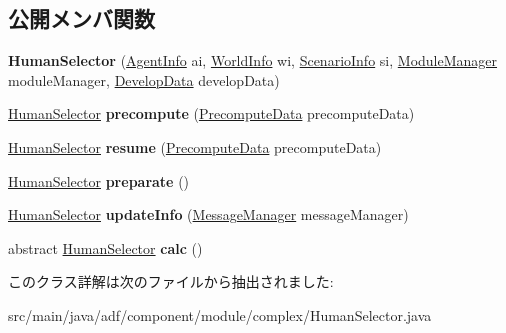 \subsection*{公開メンバ関数}
\begin{DoxyCompactItemize}
\item 
\hypertarget{classadf_1_1component_1_1module_1_1complex_1_1HumanSelector_a15c1bfebf9e8b8a6c2b2948cd65df4bb}{}\label{classadf_1_1component_1_1module_1_1complex_1_1HumanSelector_a15c1bfebf9e8b8a6c2b2948cd65df4bb} 
{\bfseries Human\+Selector} (\hyperlink{classadf_1_1agent_1_1info_1_1AgentInfo}{Agent\+Info} ai, \hyperlink{classadf_1_1agent_1_1info_1_1WorldInfo}{World\+Info} wi, \hyperlink{classadf_1_1agent_1_1info_1_1ScenarioInfo}{Scenario\+Info} si, \hyperlink{classadf_1_1agent_1_1module_1_1ModuleManager}{Module\+Manager} module\+Manager, \hyperlink{classadf_1_1agent_1_1develop_1_1DevelopData}{Develop\+Data} develop\+Data)
\item 
\hypertarget{classadf_1_1component_1_1module_1_1complex_1_1HumanSelector_aab8f2b1b49116c44c733f81939e12cda}{}\label{classadf_1_1component_1_1module_1_1complex_1_1HumanSelector_aab8f2b1b49116c44c733f81939e12cda} 
\hyperlink{classadf_1_1component_1_1module_1_1complex_1_1HumanSelector}{Human\+Selector} {\bfseries precompute} (\hyperlink{classadf_1_1agent_1_1precompute_1_1PrecomputeData}{Precompute\+Data} precompute\+Data)
\item 
\hypertarget{classadf_1_1component_1_1module_1_1complex_1_1HumanSelector_a34cda6e6b019c26ebfc14806185cb2c0}{}\label{classadf_1_1component_1_1module_1_1complex_1_1HumanSelector_a34cda6e6b019c26ebfc14806185cb2c0} 
\hyperlink{classadf_1_1component_1_1module_1_1complex_1_1HumanSelector}{Human\+Selector} {\bfseries resume} (\hyperlink{classadf_1_1agent_1_1precompute_1_1PrecomputeData}{Precompute\+Data} precompute\+Data)
\item 
\hypertarget{classadf_1_1component_1_1module_1_1complex_1_1HumanSelector_acaf2eba3095f73bac4a664e9c58bf1c6}{}\label{classadf_1_1component_1_1module_1_1complex_1_1HumanSelector_acaf2eba3095f73bac4a664e9c58bf1c6} 
\hyperlink{classadf_1_1component_1_1module_1_1complex_1_1HumanSelector}{Human\+Selector} {\bfseries preparate} ()
\item 
\hypertarget{classadf_1_1component_1_1module_1_1complex_1_1HumanSelector_a9dc59b731a3024201c0b400e32780f55}{}\label{classadf_1_1component_1_1module_1_1complex_1_1HumanSelector_a9dc59b731a3024201c0b400e32780f55} 
\hyperlink{classadf_1_1component_1_1module_1_1complex_1_1HumanSelector}{Human\+Selector} {\bfseries update\+Info} (\hyperlink{classadf_1_1agent_1_1communication_1_1MessageManager}{Message\+Manager} message\+Manager)
\item 
\hypertarget{classadf_1_1component_1_1module_1_1complex_1_1HumanSelector_a11a99067fd384b94baf3954805c33e66}{}\label{classadf_1_1component_1_1module_1_1complex_1_1HumanSelector_a11a99067fd384b94baf3954805c33e66} 
abstract \hyperlink{classadf_1_1component_1_1module_1_1complex_1_1HumanSelector}{Human\+Selector} {\bfseries calc} ()
\end{DoxyCompactItemize}


このクラス詳解は次のファイルから抽出されました\+:\begin{DoxyCompactItemize}
\item 
src/main/java/adf/component/module/complex/Human\+Selector.\+java\end{DoxyCompactItemize}
